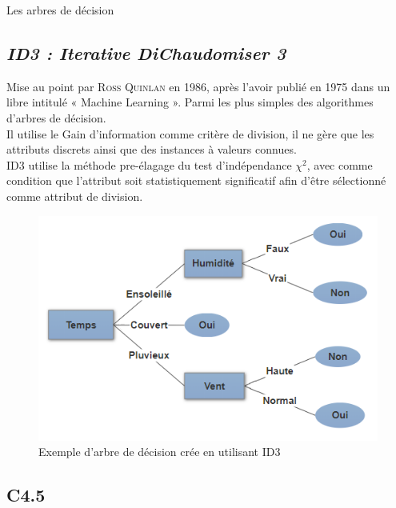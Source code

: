 \documentclass[a4paper, 11pt]{report}
\begin{document}
\begin{chapter}{Les arbres de décision}
\subsection{\emph{ID3 : Iterative DiChaudomiser 3}} 
Mise au point par \textsc{Ross Quinlan} en 1986, après l'avoir publié en 1975 dans un libre intitulé « Machine Learning ». Parmi les plus simples des algorithmes d'arbres de décision. \\Il utilise le Gain d'information comme critère de division, il ne gère que les attributs discrets ainsi que des instances à valeurs connues\cite{Hssina2014ACS}.\\ID3 utilise la méthode pre-élagage du test d'indépendance $\chi^2$, avec comme condition que l'attribut soit statistiquement significatif afin d'être sélectionné comme attribut de division.
\begin{figure}[h!]
\begin{center}
\includegraphics[scale=0.55]{Images/arbre_id3}
\end{center}
\caption{Exemple d'arbre de décision crée en utilisant ID3}
\end{figure}

\subsection{C4.5} 


\end{chapter}
\end{document}
